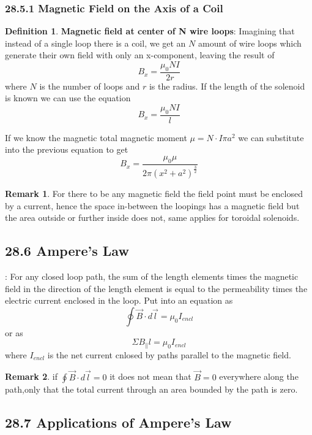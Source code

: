 \documentclass[12pt]{amsart}
\theoremstyle{definition}
\newtheorem{definition}{Definition} %
\newtheorem*{remark}{Remark}        %
\numberwithin{equation}{theorem}    %
\begin{document}
\subsubsection*{28.5.1 Magnetic Field on the Axis of a Coil}

\begin{definition}
    \textbf{Magnetic field at center of N wire loops}:
    Imagining that instead of a single loop there is a coil, we get an $N$ amount of wire loops which generate their own field with only an x-component, leaving the result of $$B_x = \frac{\mu_0NI}{2r}$$
    where $N$ is the number of loops and $r$ is the radius. 
    If the length of the solenoid is known we can use the equation
    $$B_x =\frac{\mu_0NI}{l}$$
    
    If we know the magnetic total magnetic moment $\mu = N\cdot I\pi a^2$ we can substitute into the previous equation to get 
    $$B_x = \frac{\mu_0 \mu}{2\pi(x^2+a^2)^{\frac{3}{2}}} $$

    \begin{remark}
        For there to be any magnetic field the field point must be enclosed by a current, hence the space in-between the loopings has a magnetic field but the area outside or further inside does not, same applies for toroidal solenoids.
    \end{remark}
\end{definition}

\subsection*{28.6 Ampere's Law}:
For any closed loop path, the sum of the length elements times the magnetic field in the direction of the length element is equal to the permeability times the electric current enclosed in the loop. Put into an equation as 
$$\oint\vec{B} \cdot d\vec{l} = \mu_0I_{encl}$$ or as $$\Sigma B_\parallel l = \mu_0I_{encl}$$ where $I_{encl}$ is the net current cnlosed by paths parallel to the magnetic field.

\begin{remark}
    if $\oint\vec{B} \cdot d\vec{l} = 0$ it does not mean that $\vec{B} = 0$  everywhere along the path,only that the total current through an area bounded by the path is zero.
\end{remark}

\subsection*{28.7 Applications of Ampere's Law}
\end{document}

